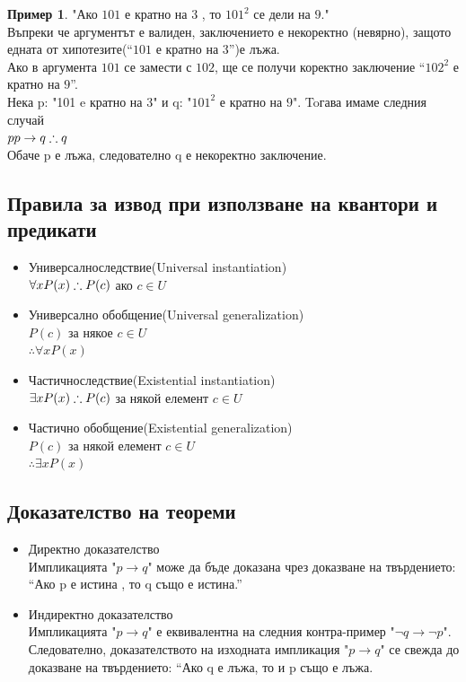 \documentclass[fleqn, 12pt]{article}
\theoremstyle{definition}
\newtheorem{example}{Пример}[subsection]
\begin{document}
\begin{example}
"Ако $101$ е кратно на $3$ , то $101^2$ се дели на $9$." \\
Въпреки че аргументът е валиден, заключението е некоректно (невярно), защото едната от хипотезите(“$101$ е кратно на $3$”)е лъжа. \\
Ако в аргумента $101$ се замести с $102$, ще се получи коректно заключение “$102^2$ е кратно на $9$”.
\\ 
Нека p: "101 e кратно на 3" и q: "$101^2$ е кратно на $9$". Toгава имаме следния случай
\\
$p
\\ p \to q 
\\ \therefore q$
\\Обаче p е лъжа, следователно q е некоректно заключение. 
\end{example}

\subsection{Правила за извод при използване на квантори и предикати}

\begin{itemize}
	\item Универсалноследствие(Universal instantiation)
\\
$\forall x P(x) 
\\
\therefore P(c)$ ако $c \in U$
	\item Универсално обобщение(Universal generalization)
\\
$ P(c)$ за някое $c \in U$ 
\\
$\therefore\forall x P(x)$

	\item Частичноследствие(Existential instantiation)
\\
$\exists x P(x) 
\\
\therefore P(c)$ за някой елемент $c \in U$

	\item Частично обобщение(Existential generalization)
\\
$P(c)$ за някой елемент $c \in U$
\\
$\therefore \exists x P(x)  $
\end{itemize}

\subsection{Доказателство на теореми}
\begin{itemize}
	\item Директно доказателство \\
Импликацията "$p \to q$" може да бъде доказана чрез доказване на твърдението:\\
 “Ако p е истина , то q също е истина.”
	\item Индиректно доказателство \\
Импликацията "$p \to q$" е еквивалентна на следния контра-пример "$\neg q \to \neg p$". Следователно, доказателството на изходната импликация "$p \to q$" се свежда до доказване на твърдението: “Ако q е лъжа, то и p също е лъжа.
\end{itemize}
\end{document}
